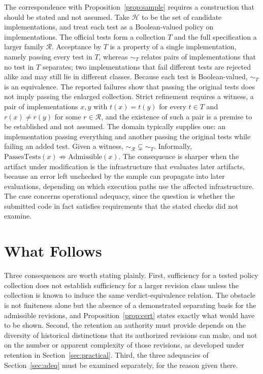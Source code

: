 \documentclass[11pt]{article}
\theoremstyle{remark}
\newcommand{\Hist}{\mathcal{H}}
\newcommand{\Rev}{\mathcal{R}}
\begin{document}
The correspondence with Proposition~\ref{prop:sample} requires a construction that should be stated and not assumed. Take $\Hist$ to be the set of candidate implementations, and treat each test as a Boolean-valued policy on implementations. The official tests form a collection $T$ and the full specification a larger family $\Rev$. Acceptance by $T$ is a property of a single implementation, namely passing every test in $T$, whereas $\sim_T$ relates pairs of implementations that no test in $T$ separates; two implementations that fail different tests are rejected alike and may still lie in different classes. Because each test is Boolean-valued, $\sim_T$ is an equivalence. The reported failures show that passing the original tests does not imply passing the enlarged collection. Strict refinement requires a witness, a pair of implementations $x,y$ with $t(x)=t(y)$ for every $t\in T$ and $r(x)\ne r(y)$ for some $r\in\Rev$, and the existence of such a pair is a premise to be established and not assumed. The domain typically supplies one: an implementation passing everything and another passing the original tests while failing an added test. Given a witness, $\sim_{\Rev}\subsetneq\sim_T$. Informally, $\mathrm{PassesTests}(x)\not\Rightarrow\mathrm{Admissible}(x)$. The consequence is sharper when the artifact under modification is the infrastructure that evaluates later artifacts, because an error left unchecked by the sample can propagate into later evaluations, depending on which execution paths use the affected infrastructure. The case concerns operational adequacy, since the question is whether the submitted code in fact satisfies requirements that the stated checks did not examine.

\section{What Follows}

Three consequences are worth stating plainly. First, sufficiency for a tested policy collection does not establish sufficiency for a larger revision class unless the collection is known to induce the same verdict-equivalence relation. The obstacle is not finiteness alone but the absence of a demonstrated separating basis for the admissible revisions, and Proposition~\ref{prop:cert} states exactly what would have to be shown. Second, the retention an authority must provide depends on the diversity of historical distinctions that its authorized revisions can make, and not on the number or apparent complexity of those revisions, as developed under retention in Section~\ref{sec:practical}. Third, the three adequacies of Section~\ref{sec:adeq} must be examined separately, for the reason given there.
\end{document}
